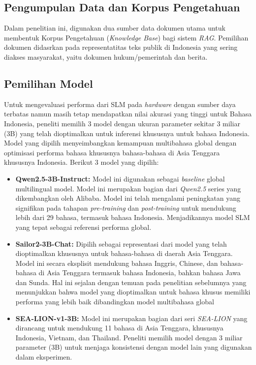 \subsection{Pengumpulan Data dan Korpus Pengetahuan}
Dalam penelitian ini, digunakan dua sumber data dokumen utama untuk membentuk Korpus Pengetahuan (\textit{Knowledge Base}) bagi sistem \textit{RAG}. Pemilihan dokumen didasrkan pada representatitas teks publik di Indonesia yang sering diakses masyarakat, yaitu dokumen hukum/pemerintah dan berita.
\subsection{Pemilihan Model}
Untuk mengevaluasi performa dari SLM pada \textit{hardware} dengan sumber daya terbatas namun masih tetap mendapatkan nilai akurasi yang tinggi untuk Bahasa Indonesia, peneliti memilih 3 model dengan ukuran parameter sekitar 3 miliar (3B) yang telah dioptimalkan untuk inferensi khususnya untuk bahasa Indonesia. Model yang dipilih menyeimbangkan kemampuan multibahasa global dengan optimisasi performa bahasa khususnya bahasa-bahasa di Asia Tenggara khususnya Indonesia. Berikut 3 model yang dipilih:
\begin{itemize}
    \item \textbf{Qwen2.5-3B-Instruct:} Model ini digunakan sebagai \textit{baseline} global multilingual model. Model ini merupakan bagian dari \textit{Qwen2.5} series yang dikembangkan oleh Alibaba. Model ini telah mengalami peningkatan yang signifikan pada tahapan \textit{pre-training} dan \textit{post-training} untuk mendukung lebih dari 29 bahasa, termasuk bahasa Indonesia. Menjadikannya model SLM yang tepat sebagai referensi performa global.
    \item \textbf{Sailor2-3B-Chat:} Dipilih sebagai representasi dari model yang telah dioptimalkan khususnya untuk bahasa-bahasa di daerah Asia Tenggara. Model ini secara eksplisit mendukung bahasa Inggris, Chinese, dan bahasa-bahasa di Asia Tenggara termasuk bahasa Indonesia, bahkan bahasa Jawa dan Sunda. Hal ini sejalan dengan temuan pada penelitian sebelumnya yang menunjukkan bahwa model yang dioptimalkan untuk bahasa khusus memiliki performa yang lebih baik dibandingkan model multibahasa global \citep{cahyawijaya2021indonlg}
    \item \textbf{SEA-LION-v1-3B:} Model ini merupakan bagian dari seri \textit{SEA-LION} yang dirancang untuk mendukung 11 bahasa di Asia Tenggara, khususnya Indonesia, Vietnam, dan Thailand. Peneliti memilih model dengan 3 miliar parameter (3B) untuk menjaga konsistensi dengan model lain yang digunakan dalam eksperimen.
\end{itemize}
